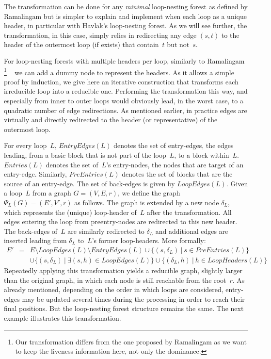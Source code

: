The transformation can be done for any \emph{minimal} loop-nesting forest as defined by Ramalingam but is simpler to explain and implement when each loop as a unique header, in particular with Havlak's loop-nesting forest.
As we will see further, the transformation, in this case, simply relies in redirecting any edge $(s,t)$ to the header of the outermost loop (if exists) that contain~$t$ but not~$s$.

For loop-nesting forests with multiple headers per loop, similarly to Ramalingam%
\footnote{Our transformation differs from the one proposed by Ramalingam as we want to keep the liveness information here, not only the dominance.}%
~\cite{ramalingam:2002:loopforest:minimal} we can add a dummy node to represent the headers.
As it allows a simple proof by induction, we give here an iterative construction that transforms each irreducible loop into a reducible one.
Performing the transformation this way, and especially from inner to outer loops would obviously lead, in the worst case, to a quadratic number of edge redirections.
As mentioned earlier, in practice edges are virtually and directly redirected to the header (or representative) of the outermost loop.

For every loop~$L$, $\textit{EntryEdges}(L)$ denotes the set of entry-edges, \ie the edges leading, from a basic block that is not part of the loop~$L$, to a block within~$L$.
$\textit{Entries}(L)$ denotes the set of~$L$'s entry-nodes, \ie the nodes that are target of an entry-edge.
Similarly, $\textit{PreEntries}(L)$ denotes the set of blocks that are the source of an entry-edge.
The set of back-edges is given by $\textit{LoopEdges}(L)$.
Given a loop~$L$ from a graph $G = (V, E, r)$, we define the graph $\Psi_L (G) = (E', V', r)$ as follows.
The graph is extended by a new node $\delta_L$, which represents the (unique) loop-header of~$L$ after the transformation.
All edges entering the loop from preentry-nodes are redirected to this new header.
The back-edges of~$L$ are similarly redirected to $\delta_L$ and additional edges are inserted leading from $\delta_L$ to~$L$'s former loop-headers.
More formally:
%
\begin{eqnarray*}
  E' & = & E \setminus \textit{LoopEdges}(L) \setminus \textit{EntryEdges}(L)
\cup \{ (s, \delta_L)~|~s \in \textit{PreEntries}(L) \} \\
     &   & \cup \{ (s, \delta_L)~|~\exists (s, h) \in \textit{LoopEdges}(L) \}
\cup \{ (\delta_L, h)~|~h  \in \textit{LoopHeaders}(L) \}
\end{eqnarray*}
%
Repeatedly applying this transformation yields a reducible graph, slightly larger than the original graph, in which each node is still reachable from the root~$r$.
As already mentioned, depending on the order in which loops are considered, entry-edges may be updated several times during the processing in order to reach their final positions.
But the loop-nesting forest structure remains the same.
The next example illustrates this transformation.


